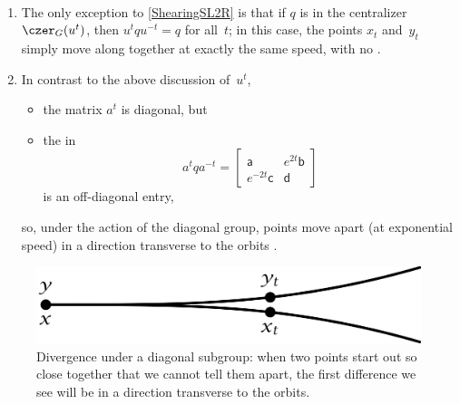 \begin{rems} \ 
\noprelistbreak
\begin{enumerate}
\item The only exception to \cref{ShearingSL2R} is that if $q$ is in the centralizer $\czer_G(u^t)$, then $u^t q u^{-t} = q$ for
all~$t$; in this case, the points $x_t$ and~$y_t$ simply move along
together at exactly the same speed, with no \term{relative motion}.
\item  In contrast to the above discussion of~$u^t$, 
 \begin{itemize}
 \item the matrix $a^t$ is diagonal, 
 but
 \item the  in 
 	$$ a^t q a^{-t} = \begin{bmatrix}
 \mathsf{a} & e^{2t} \mathsf{b} \\
e^{-2t} \mathsf{c}  & \mathsf{d} 
 \end{bmatrix} $$
is an off-diagonal entry,
 \end{itemize}
 so, under the action of the diagonal group, points move apart (at
exponential speed) in a direction transverse to the orbits
. 
\end{enumerate}
 \end{rems}

 \begin{figure}[ht]
 \begin{center}
 \includegraphics{PDF/expdiv.jpg}
 \caption{Divergence under a diagonal subgroup: when two points start out so close
together that we cannot tell them apart, the first difference we see
will be in a direction transverse to the orbits.}
 \label{expdivfig}
 \end{center}
 \end{figure}
%
%
%
%
%
%

